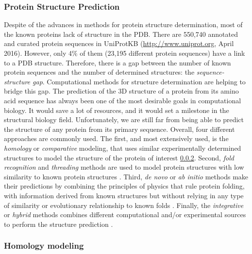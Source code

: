 \documentclass[12pt, a4paper,twoside]{tesi_upf}
\begin{document}
\pagebreak

\subsubsection{Protein Structure Prediction} \label{structure_predicion}


\par Despite of the advances in methods for protein structure determination, most of the known proteins lack of structure in the PDB. There are 550,740 annotated and curated protein sequences in UniProtKB (\url{http://www.uniprot.org}, April 2016).  However, only 4$\%$ of them (23,195 different protein sequences) have a link to a PDB structure. Therefore, there is a gap between the number of known protein sequences and the number of determined structures: the \textit{sequence-structure gap}. 
Computational methods for structure determination are helping to bridge this gap. The prediction of the 3D structure of a protein from its amino acid sequence has always been one of the most desirable goals in computational biology. It would save a lot of resources, and it would set a milestone in the structural biology field. Unfortunately, we are still far from being able to predict the structure of any protein from its primary sequence. Overall, four different approaches are commonly used. The first, and most extensively used, is the \textit{homology} or \textit{comparative} modeling, that uses similar experimentally determined structures to model the structure of the protein of interest \ref{Homology_modeling}. Second, \textit{fold recognition} and \textit{threading} methods are used to model protein structures with low similarity to known protein structures \cite{Jones1992, Bowie1991}. Third, \textit{de novo} or \textit{ab initio} methods make their predictions by combining the principles of physics that rule protein folding, with information derived from known structures but without relying in any type of similarity or evolutionary relationship to known folds \cite{Lee2009}. Finally, the \textit{integrative} or \textit{hybrid} methods combines different computational and/or experimental sources to perform the structure prediction \cite{Russel2012}.   
 
\subsubsection{Homology modeling} \label{Homology_modeling}
\end{document}
